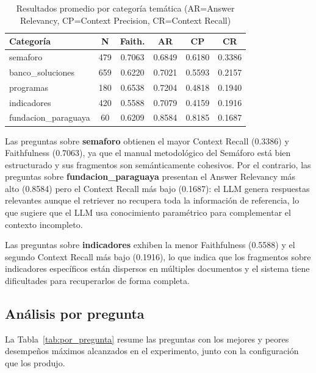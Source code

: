 \documentclass{article}
\begin{document}
\begin{table}[H]
\centering
\begin{tabular}{|l|c|c|c|c|c|}
\hline
\textbf{Categoría} & \textbf{N} & \textbf{Faith.} & \textbf{AR} & \textbf{CP} & \textbf{CR} \\
\hline
semaforo             & 479 & 0.7063 & 0.6849 & 0.6180 & 0.3386 \\
banco\_soluciones    & 659 & 0.6220 & 0.7021 & 0.5593 & 0.2157 \\
programas            & 180 & 0.6538 & 0.7204 & 0.4818 & 0.1940 \\
indicadores          & 420 & 0.5588 & 0.7079 & 0.4159 & 0.1916 \\
fundacion\_paraguaya &  60 & 0.6209 & 0.8584 & 0.8185 & 0.1687 \\
\hline
\end{tabular}
\caption{Resultados promedio por categoría temática (AR=Answer Relevancy, CP=Context Precision, CR=Context Recall)}
\label{tab:por_categoria}
\end{table}

Las preguntas sobre \textbf{semaforo} obtienen el mayor Context Recall (0.3386)
y Faithfulness (0.7063), ya que el manual metodológico del Semáforo está bien
estructurado y sus fragmentos son semánticamente cohesivos. Por el contrario,
las preguntas sobre \textbf{fundacion\_paraguaya} presentan el Answer Relevancy
más alto (0.8584) pero el Context Recall más bajo (0.1687): el LLM genera
respuestas relevantes aunque el retriever no recupera toda la información de
referencia, lo que sugiere que el LLM usa conocimiento paramétrico para
complementar el contexto incompleto.

Las preguntas sobre \textbf{indicadores} exhiben la menor Faithfulness (0.5588)
y el segundo Context Recall más bajo (0.1916), lo que indica que los fragmentos
sobre indicadores específicos están dispersos en múltiples documentos y el
sistema tiene dificultades para recuperarlos de forma completa.

\subsection{Análisis por pregunta}

La Tabla~\ref{tab:por_pregunta} resume las preguntas con los mejores y peores
desempeños máximos alcanzados en el experimento, junto con la configuración que
los produjo.
\end{document}
